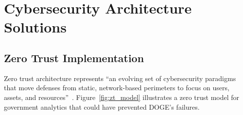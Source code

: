 \documentclass[sigconf,nonacm]{acmart}
\begin{document}
\section{Cybersecurity Architecture Solutions}

\subsection{Zero Trust Implementation}

Zero trust architecture represents ``an evolving set of cybersecurity paradigms that
move defenses from static, network-based perimeters to focus on users, assets, and
resources''~\cite{nist2021zt}. Figure~\ref{fig:zt_model} illustrates a zero trust
model for government analytics that could have prevented DOGE's failures.
\end{document}
